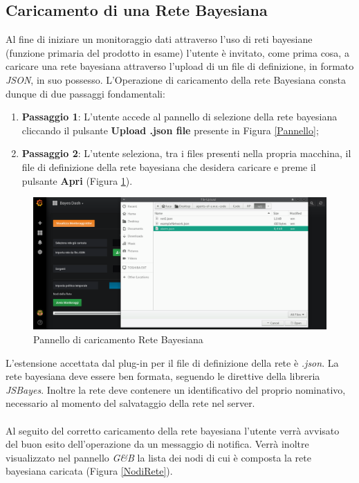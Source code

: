 \subsection{Caricamento di una Rete Bayesiana}\label{ReteB}

Al fine di iniziare un monitoraggio dati attraverso l'uso di reti bayesiane (funzione primaria del prodotto in esame) l'utente è invitato, come prima cosa, a caricare una rete bayesiana attraverso l'upload di un file di definizione, in formato \textit{JSON}, in suo possesso. L'Operazione di caricamento della rete Bayesiana consta dunque di due passaggi fondamentali:
\begin{enumerate}
	\item \textbf{Passaggio 1}: L'utente accede al pannello di selezione della rete bayesiana cliccando il pulsante \textbf{Upload .json file} presente in Figura \ref{Pannello};
	\item \textbf{Passaggio 2}: L'utente seleziona, tra i files presenti nella propria macchina, il file di definizione della rete bayesiana che desidera caricare e preme il pulsante \textbf{Apri} (Figura \ref{UploadRete}).
\end{enumerate} 

\begin{figure}[H]
	\begin{center}
		\includegraphics[scale=0.3]{./images/UpRete.png}
		 \caption{Pannello di caricamento Rete Bayesiana}	
		 \label{UploadRete}
	\end{center}
\end{figure}

L'estensione accettata dal plug-in per il file di definizione della rete è \textit{.json}. La rete bayesiana deve essere ben formata, seguendo le direttive della libreria \textit{JSBayes}. Inoltre la rete deve contenere un identificativo del proprio nominativo, necessario al momento del salvataggio della rete nel server.\\
~\\
Al seguito del corretto caricamento della rete bayesiana l'utente verrà avvisato del buon esito dell'operazione da un messaggio di notifica. Verrà inoltre visualizzato nel pannello \textit{G\&B} la lista dei nodi di cui è composta la rete bayesiana caricata (Figura \ref{NodiRete}).

